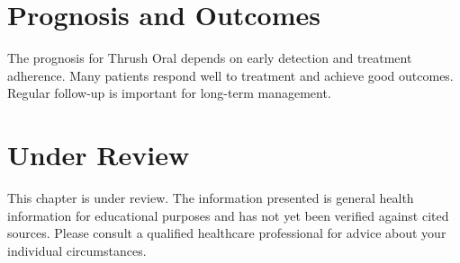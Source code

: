\section*{Prognosis and Outcomes}
The prognosis for Thrush Oral depends on early detection and treatment adherence. Many patients respond well to treatment and achieve good outcomes. Regular follow-up is important for long-term management.
\section*{Under Review}
This chapter is under review. The information presented is general health information for educational purposes and has not yet been verified against cited sources. Please consult a qualified healthcare professional for advice about your individual circumstances.


\clearpage
